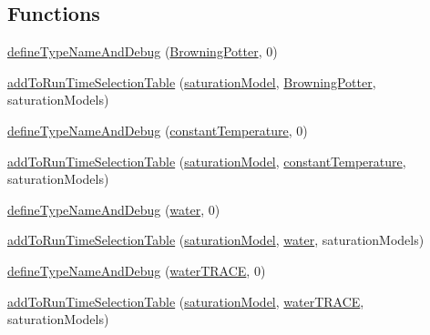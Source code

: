 \subsection*{Functions}
\begin{DoxyCompactItemize}
\item 
\hyperlink{namespaceFoam_1_1saturationModels_a3811c12490cabc1f76da0e6e2205d4a1}{define\+Type\+Name\+And\+Debug} (\hyperlink{classFoam_1_1saturationModels_1_1BrowningPotter}{Browning\+Potter}, 0)
\item 
\hyperlink{namespaceFoam_1_1saturationModels_af4c428227cb77a832cdecd8c807e03dd}{add\+To\+Run\+Time\+Selection\+Table} (\hyperlink{classFoam_1_1saturationModel}{saturation\+Model}, \hyperlink{classFoam_1_1saturationModels_1_1BrowningPotter}{Browning\+Potter}, saturation\+Models)
\item 
\hyperlink{namespaceFoam_1_1saturationModels_a72bce82172fe9ce569a42ac7bff20ec1}{define\+Type\+Name\+And\+Debug} (\hyperlink{classFoam_1_1saturationModels_1_1constantTemperature}{constant\+Temperature}, 0)
\item 
\hyperlink{namespaceFoam_1_1saturationModels_a8e4123fbe8291637baf84f9e3971010c}{add\+To\+Run\+Time\+Selection\+Table} (\hyperlink{classFoam_1_1saturationModel}{saturation\+Model}, \hyperlink{classFoam_1_1saturationModels_1_1constantTemperature}{constant\+Temperature}, saturation\+Models)
\item 
\hyperlink{namespaceFoam_1_1saturationModels_ae17645da709dc2e5c8cb049bc858a3ee}{define\+Type\+Name\+And\+Debug} (\hyperlink{classFoam_1_1saturationModels_1_1water}{water}, 0)
\item 
\hyperlink{namespaceFoam_1_1saturationModels_afcb497101cd25d4c30cc8695d2df2bab}{add\+To\+Run\+Time\+Selection\+Table} (\hyperlink{classFoam_1_1saturationModel}{saturation\+Model}, \hyperlink{classFoam_1_1saturationModels_1_1water}{water}, saturation\+Models)
\item 
\hyperlink{namespaceFoam_1_1saturationModels_a387131a2a1f830d0c7500dd8eb77f5ad}{define\+Type\+Name\+And\+Debug} (\hyperlink{classFoam_1_1saturationModels_1_1waterTRACE}{water\+T\+R\+A\+CE}, 0)
\item 
\hyperlink{namespaceFoam_1_1saturationModels_af8c4d000d19a1a66e1e1a769e7620b66}{add\+To\+Run\+Time\+Selection\+Table} (\hyperlink{classFoam_1_1saturationModel}{saturation\+Model}, \hyperlink{classFoam_1_1saturationModels_1_1waterTRACE}{water\+T\+R\+A\+CE}, saturation\+Models)
\end{DoxyCompactItemize}


